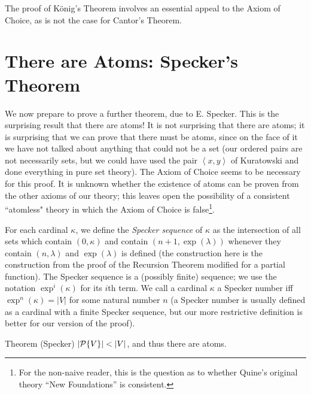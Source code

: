 The proof of K\"onig's Theorem involves an essential appeal to the
Axiom of Choice, as is not the case for Cantor's
Theorem.



\section{There are Atoms:  Specker's Theorem}

We now prepare to prove a further theorem, due to E. Specker.
This is the surprising result that there are atoms!  It
is not surprising that there are atoms; it is surprising that we can
prove that there must be atoms, since on the face of it we have not
talked about anything that could not be a set (our ordered
pairs are not necessarily sets, but we could have
used the pair $\left<x,y\right>$ of Kuratowski and done everything in
pure set theory).  The Axiom of Choice seems to
be necessary for this proof.  It is unknown whether the existence of
atoms can be proven from the other axioms of our theory;
this leaves open the possibility of a consistent ``atomless" theory in
which the Axiom of Choice is false\footnote{For the non-naive reader,
this is the question as to whether Quine's original theory ``New
Foundations'' is consistent.}.

\begin{definition}
 For each cardinal $\kappa$, we define the {\em Specker sequence\/} of
 $\kappa$ as the intersection of all sets which contain $(0,\kappa)$
 and contain $(n+1,\exp(\lambda))$ whenever they contain $(n,\lambda)$
 and $\exp(\lambda)$ is defined (the construction here is the
 construction from the proof of the Recursion Theorem modified for a
 partial function).  The Specker sequence is a (possibly finite)
 sequence; we use the notation $\exp^i(\kappa)$ for its $i$th term.  We
 call a cardinal $\kappa$ a {\upshape Specker number} iff
 $\exp^n(\kappa) = |V|$ for some natural number $n$ (a Specker
 number is usually defined as a cardinal with a finite Specker
 sequence, but our more restrictive definition is better for our
 version of the proof).
\end{definition}

\begin{Thm}{Theorem (Specker)}
 $|{\cal P}\{V\}| < |V|$, and thus there are atoms.
\end{Thm}


